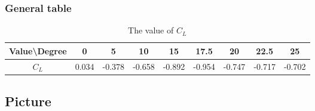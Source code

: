 \subsubsection{General table}
\begin{table}[htp]
	\centering
	\caption{The value of $C_{L}$}
	\label{T 4.3}
	\setlength{\tabcolsep}{2mm} %
	\renewcommand\arraystretch{1} %
	\begin{tabular}{cllllllll}
		\hline
		Value\textbackslash{}Degree &
		\multicolumn{1}{c}{0} &
		\multicolumn{1}{c}{5} &
		\multicolumn{1}{c}{10} &
		\multicolumn{1}{c}{15} &
		\multicolumn{1}{c}{17.5} &
		\multicolumn{1}{c}{20} &
		\multicolumn{1}{c}{22.5} &
		\multicolumn{1}{c}{25} \\ \hline
		$C_L$ &
		0.034 &
		-0.378 &
		-0.658 &
		-0.892 &
		-0.954 &
		-0.747 &
		-0.717 &
		-0.702 \\ \hline
	\end{tabular}
\end{table}
\newpage

\subsection{Picture}

